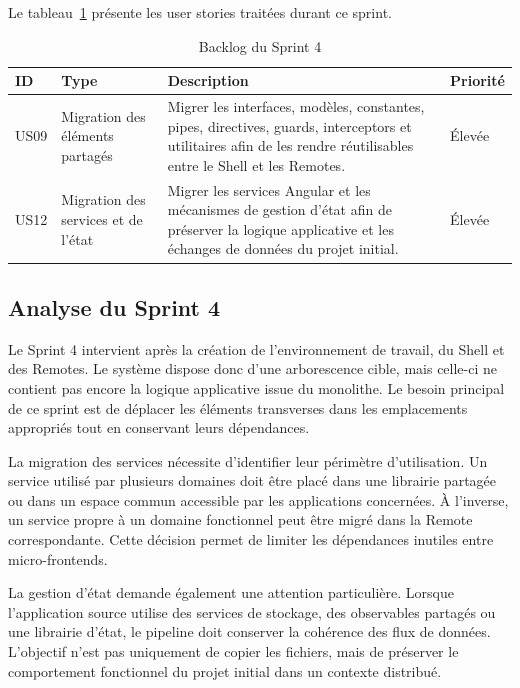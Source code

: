 Le tableau~\ref{tab:backlog-sprint4-release2} présente les user stories traitées durant ce sprint.

\begingroup
\renewcommand{\arraystretch}{1.12}
\setlength{\tabcolsep}{4pt}
\begin{longtable}{|p{1.0cm}|p{3.1cm}|p{6.55cm}|p{1.55cm}|}
\caption{Backlog du Sprint 4}\label{tab:backlog-sprint4-release2}\\
\hline
\textbf{ID} & \textbf{Type} & \textbf{Description} & \textbf{Priorité} \\
\hline
US09 & Migration des éléments partagés & Migrer les interfaces, modèles, constantes, pipes, directives, guards, interceptors et utilitaires afin de les rendre réutilisables entre le Shell et les Remotes. & Élevée \\
\hline
US12 & Migration des services et de l'état & Migrer les services Angular et les mécanismes de gestion d'état afin de préserver la logique applicative et les échanges de données du projet initial. & Élevée \\
\hline
\end{longtable}
\endgroup

\subsection{Analyse du Sprint 4}

Le Sprint 4 intervient après la création de l'environnement de travail, du Shell et des Remotes. Le système dispose donc d'une arborescence cible, mais celle-ci ne contient pas encore la logique applicative issue du monolithe. Le besoin principal de ce sprint est de déplacer les éléments transverses dans les emplacements appropriés tout en conservant leurs dépendances.

La migration des services nécessite d'identifier leur périmètre d'utilisation. Un service utilisé par plusieurs domaines doit être placé dans une librairie partagée ou dans un espace commun accessible par les applications concernées. À l'inverse, un service propre à un domaine fonctionnel peut être migré dans la Remote correspondante. Cette décision permet de limiter les dépendances inutiles entre micro-frontends.

La gestion d'état demande également une attention particulière. Lorsque l'application source utilise des services de stockage, des observables partagés ou une librairie d'état, le pipeline doit conserver la cohérence des flux de données. L'objectif n'est pas uniquement de copier les fichiers, mais de préserver le comportement fonctionnel du projet initial dans un contexte distribué.

